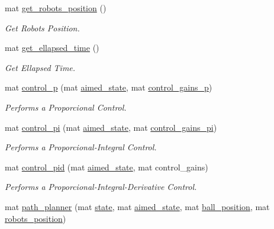 \begin{DoxyCompactItemize}
mat \hyperlink{class_robot_navigation_a9082eefeea50d92c1cf1ea07620733c3}{get\+\_\+robots\+\_\+position} ()
\begin{DoxyCompactList}\small\item\em Get Robots Position. \end{DoxyCompactList}\item 
\mbox{\label{class_robot_navigation_a63b9ea0c29057b9be47cccff6010eb8b}} 
mat \hyperlink{class_robot_navigation_a63b9ea0c29057b9be47cccff6010eb8b}{get\+\_\+ellapsed\+\_\+time} ()
\begin{DoxyCompactList}\small\item\em Get Ellapsed Time. \end{DoxyCompactList}\item 
mat \hyperlink{class_robot_navigation_a7f4ad136002a99b7b52b929fbc58c08e}{control\+\_\+p} (mat \hyperlink{class_robot_navigation_aaa625625a2ba01d1602891ea19691462}{aimed\+\_\+state}, mat \hyperlink{class_robot_navigation_ad7ff88f46b33d23be62fc365b650361e}{control\+\_\+gains\+\_\+p})
\begin{DoxyCompactList}\small\item\em Performs a Proporcional Control. \end{DoxyCompactList}\item 
mat \hyperlink{class_robot_navigation_a992572cca235436f7c2f83ec85975818}{control\+\_\+pi} (mat \hyperlink{class_robot_navigation_aaa625625a2ba01d1602891ea19691462}{aimed\+\_\+state}, mat \hyperlink{class_robot_navigation_a90738c7f4f1a884edce67e44769b284b}{control\+\_\+gains\+\_\+pi})
\begin{DoxyCompactList}\small\item\em Performs a Proporcional-\/\+Integral Control. \end{DoxyCompactList}\item 
mat \hyperlink{class_robot_navigation_a5800adf6538584180ca33a2143934dfd}{control\+\_\+pid} (mat \hyperlink{class_robot_navigation_aaa625625a2ba01d1602891ea19691462}{aimed\+\_\+state}, mat control\+\_\+gains)
\begin{DoxyCompactList}\small\item\em Performs a Proporcional-\/\+Integral-\/\+Derivative Control. \end{DoxyCompactList}\item 
mat \hyperlink{class_robot_navigation_a676195ab5a04e08452dc6fb23f84ce10}{path\+\_\+planner} (mat \hyperlink{class_robot_navigation_a93eb7dd2877e1f72f5741fb396adea81}{state}, mat \hyperlink{class_robot_navigation_aaa625625a2ba01d1602891ea19691462}{aimed\+\_\+state}, mat \hyperlink{class_robot_navigation_a1e4f1a5b3c01ba9be911c006b478f371}{ball\+\_\+position}, mat \hyperlink{class_robot_navigation_a75aaeeea363d928d6dc8c6de90824d3f}{robots\+\_\+position})

\end{DoxyCompactItemize}
